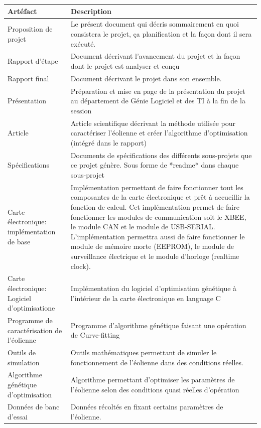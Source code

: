 \begin{longtabu} to \linewidth {X[1,l]X[2,l]}
  \textbf{Artéfact} & \textbf{Description} \\ \hline
  Proposition de projet & Le présent document qui décris sommairement en quoi consistera le projet, ça planification et la façon dont il sera exécuté.\\ \hline
  Rapport d'étape & Document décrivant l'avancement du projet et la façon dont le projet est analyser et conçu \\ \hline
  Rapport final & Document décrivant le projet dans son ensemble.\\ \hline
  Présentation & Préparation et mise en page de la présentation du projet au département de Génie Logiciel et des TI à la fin de la session\\ \hline
  Article & Article scientifique décrivant la méthode utilisée pour caractériser l'éolienne et créer l'algorithme d'optimisation (intégré dans le rapport)\\ \hline
  Spécifications & Documents de spécifications des différents sous-projets que ce projet génère. Sous forme de *readme* dans chaque sous-projet\\ \hline
  Carte électronique: implémentation de base & Implémentation permettant de faire fonctionner tout les composantes de la carte électronique et prêt à accueillir la fonction de calcul. Cet implémentation permet de faire fonctionner les modules de communication soit le XBEE, le module CAN et le module de USB-SERIAL. L'implémentation permettra aussi de faire fonctionner le module de mémoire morte (EEPROM), le module de surveillance électrique et le module d'horloge (realtime clock).\\ \hline
  Carte électronique: Logiciel d'optimisatione & Implémentation du logiciel d'optimisation génétique à l'intérieur de la carte électronique en language C\\ \hline
  Programme de caractérisation de l'éolienne & Programme d'algorithme génétique faisant une opération de Curve-fitting \\ \hline
  Outils de simulation & Outils mathématiques permettant de simuler le fonctionnement de l'éolienne dans des conditions réelles. \\ \hline
  Algorithme génétique d'optimisation & Algorithme permettant d'optimiser les paramètres de l'éolienne selon des conditions quasi réelles d'opération \\ \hline
  Données de banc d'essai & Données récoltés en fixant certains paramètres de l'éolienne. \\ \hline

\end{longtabu}
